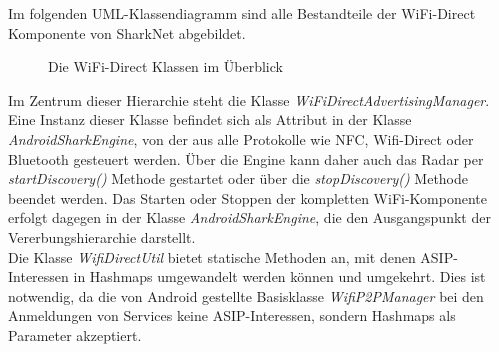 Im folgenden UML-Klassendiagramm sind alle Bestandteile der WiFi-Direct Komponente von SharkNet abgebildet.
\begin{figure}[H]
	\centering
	\hspace*{1cm}
	\caption{Die WiFi-Direct Klassen im Überblick}
	\label{fig:wifiAll}
\end{figure}
Im Zentrum dieser Hierarchie steht die Klasse \textit{WiFiDirectAdvertisingManager}. Eine Instanz dieser Klasse befindet sich als Attribut in der Klasse \textit{AndroidSharkEngine}, von der aus alle Protokolle wie NFC, Wifi-Direct oder Bluetooth gesteuert werden. Über die Engine kann daher auch das Radar per \textit{startDiscovery()} Methode gestartet oder über die \textit{stopDiscovery()} Methode beendet werden. Das Starten oder Stoppen der kompletten WiFi-Komponente erfolgt dagegen in der Klasse \textit{AndroidSharkEngine}, die den Ausgangspunkt der Vererbungshierarchie darstellt.
\\Die Klasse \textit{WifiDirectUtil} bietet statische Methoden an, mit denen ASIP-Interessen in Hashmaps umgewandelt werden können und umgekehrt. Dies ist notwendig, da die von Android gestellte Basisklasse \textit{WifiP2PManager} bei den Anmeldungen von Services keine ASIP-Interessen, sondern Hashmaps als Parameter akzeptiert.

